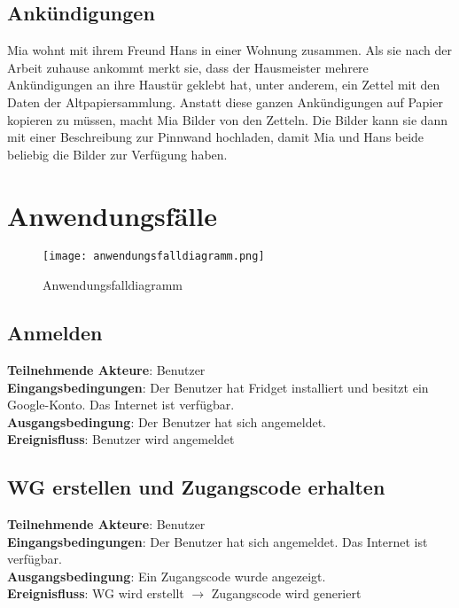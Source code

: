 \documentclass[a4paper]{scrreprt}
\begin{document}
        \subsection{Ankündigungen}
        Mia wohnt mit ihrem Freund Hans in einer Wohnung zusammen. Als sie nach der Arbeit zuhause ankommt merkt sie, dass der Hausmeister mehrere Ankündigungen an ihre Haustür geklebt hat, unter anderem, ein Zettel mit den Daten der Altpapiersammlung.
        Anstatt diese ganzen Ankündigungen auf Papier kopieren zu müssen, macht Mia Bilder von den Zetteln. Die Bilder kann sie dann mit einer Beschreibung zur Pinnwand hochladen, damit Mia und Hans beide beliebig die Bilder zur Verfügung haben.
        

        \newpage
        \section{Anwendungsfälle}
        	\begin{figure}[h!]
        		\centering
        		\texttt{[image: anwendungsfalldiagramm.png]}
        		\caption{Anwendungsfalldiagramm}
        	\end{figure}
        	
        	\subsection{Anmelden}
        	\textbf{Teilnehmende Akteure}: Benutzer \\
        	\textbf{Eingangsbedingungen}: Der Benutzer hat Fridget installiert und besitzt ein Google-Konto. Das Internet ist verfügbar. \\
        	\textbf{Ausgangsbedingung}: Der Benutzer hat sich angemeldet. \\
        	\textbf{Ereignisfluss}: Benutzer wird angemeldet
        	
        	\subsection{WG erstellen und Zugangscode erhalten}
        	\textbf{Teilnehmende Akteure}: Benutzer \\
        	\textbf{Eingangsbedingungen}: Der Benutzer hat sich angemeldet. Das Internet ist verfügbar. \\
        	\textbf{Ausgangsbedingung}: Ein Zugangscode wurde angezeigt. \\
        	\textbf{Ereignisfluss}: WG wird erstellt $\rightarrow$ Zugangscode wird generiert
        	
\end{document}
